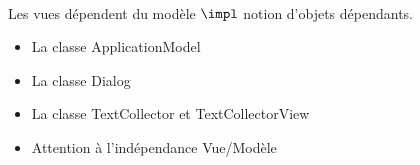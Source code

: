 \\

 Les vues dépendent du modèle $\impl$ notion d'objets dépendants. \\

	\begin{itemize}
		\item La classe ApplicationModel 
		\item La classe Dialog
		\item La classe TextCollector et TextCollectorView
		\item Attention à l'indépendance Vue/Modèle
	\end{itemize}
